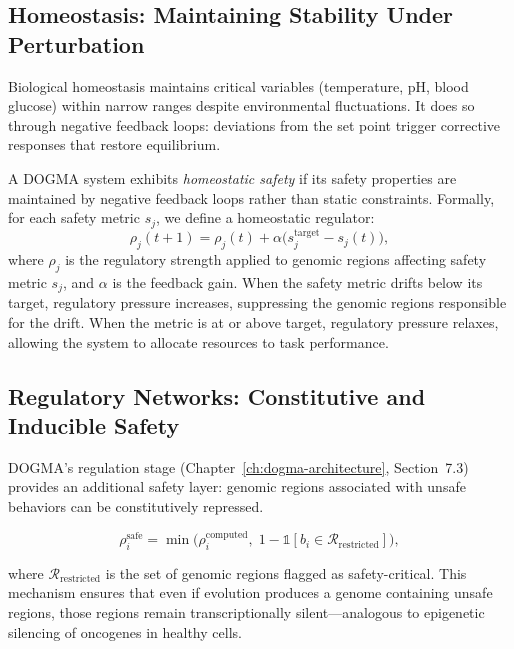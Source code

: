 \subsection{Homeostasis: Maintaining Stability Under Perturbation}

Biological homeostasis maintains critical variables (temperature, pH, blood glucose) within narrow ranges despite environmental fluctuations.
It does so through negative feedback loops: deviations from the set point trigger corrective responses that restore equilibrium.

\begin{dogmadef}
A DOGMA system exhibits \emph{homeostatic safety} if its safety properties are maintained by negative feedback loops rather than static constraints.
Formally, for each safety metric $s_j$, we define a homeostatic regulator:
\begin{equation}
  \rho_j(t+1) = \rho_j(t) + \alpha \bigl(s_j^{\text{target}} - s_j(t)\bigr),
\end{equation}
where $\rho_j$ is the regulatory strength applied to genomic regions affecting safety metric $s_j$, and $\alpha$ is the feedback gain.
When the safety metric drifts below its target, regulatory pressure increases, suppressing the genomic regions responsible for the drift.
When the metric is at or above target, regulatory pressure relaxes, allowing the system to allocate resources to task performance.
\end{dogmadef}

\subsection{Regulatory Networks: Constitutive and Inducible Safety}

DOGMA's regulation stage (Chapter~\ref{ch:dogma-architecture}, Section~7.3) provides an additional safety layer: genomic regions associated with unsafe behaviors can be constitutively repressed.

\begin{equation}
\rho_i^{\text{safe}} = \min\bigl(\rho_i^{\text{computed}},\; 1 - \mathbb{1}[b_i \in \mathcal{R}_{\text{restricted}}]\bigr),
\label{eq:safety-regulation}
\end{equation}

where $\mathcal{R}_{\text{restricted}}$ is the set of genomic regions flagged as safety-critical.
This mechanism ensures that even if evolution produces a genome containing unsafe regions, those regions remain transcriptionally silent---analogous to epigenetic silencing of oncogenes in healthy cells.

